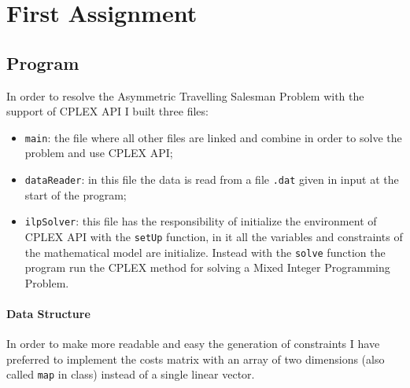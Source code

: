 \section{First Assignment}

	\subsection{Program}
		In order to resolve the Asymmetric Travelling Salesman Problem with the support of CPLEX API I built three files:
		\begin{itemize}
			\item \verb|main|: the file where all other files are linked and combine in order to solve the problem and use CPLEX API;
			\item \verb|dataReader|: in this file the data is read from a file \verb|.dat| given in input at the start of the program;
			\item \verb|ilpSolver|: this file has the responsibility of initialize the environment of CPLEX API with the \verb|setUp| function, in it all the variables and constraints of the mathematical model are initialize. Instead with the \verb|solve| function the program run the CPLEX method for solving a Mixed Integer Programming Problem.
		\end{itemize}
	
		\paragraph{Data Structure} In order to make more readable and easy the generation of constraints I have preferred to implement the costs matrix with an array of two dimensions (also called \verb|map| in class) instead of a single linear vector.


